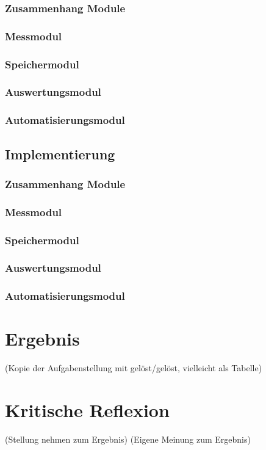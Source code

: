 \documentclass[
    load-dhbw-templates,
    load-preamble = true,
    auto-intro-pages = all,
    add-tocs-to-toc,
    debug = true,
    language = english,
    mainlanguage = ngerman,
    add-bibliography,
    bib-file = dhbw-source.bib,
    biblatex/style = alphabetic, 
]{iodhbwm}
\begin{document}
        \subsection{Zusammenhang Module}
        \subsection{Messmodul}
        \subsection{Speichermodul}
        \subsection{Auswertungsmodul}
        \subsection{Automatisierungsmodul}
    \section{Implementierung}
        \subsection{Zusammenhang Module}
        \subsection{Messmodul}
        \subsection{Speichermodul}
        \subsection{Auswertungsmodul}
        \subsection{Automatisierungsmodul}
    
\chapter{Ergebnis}
    (Kopie der Aufgabenstellung mit gelöst/gelöst, vielleicht als Tabelle)
    
\chapter{Kritische Reflexion}
    (Stellung nehmen zum Ergebnis)
    (Eigene Meinung zum Ergebnis)
\end{document}
